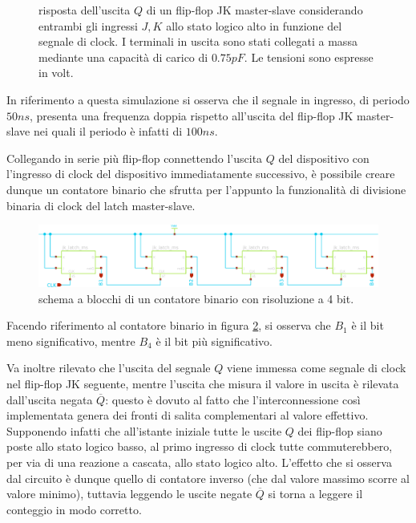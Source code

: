 	\begin{figure}[bht]
		\centering
		
		\vspace{3mm}
		\caption{risposta dell'uscita $Q$ di un flip-flop JK master-slave considerando entrambi gli ingressi $J,K$ allo stato logico alto in funzione del segnale di clock. I terminali in uscita sono stati collegati a massa mediante una capacità di carico di $0.75pF$. Le tensioni sono espresse in volt.}
		\label{fig:count:single}
	\end{figure}
	
	In riferimento a questa simulazione si osserva che il segnale in ingresso, di periodo $50ns$, presenta una frequenza doppia rispetto all'uscita del flip-flop JK master-slave nei quali il periodo è infatti di $100ns$.
	
	Collegando in serie più flip-flop connettendo l'uscita $Q$ del dispositivo con l'ingresso di clock del dispositivo immediatamente successivo, è possibile creare dunque un contatore binario che sfrutta per l'appunto la funzionalità di divisione binaria di clock del latch master-slave.
	
	\begin{figure}[bht]
		\centering
		\includegraphics[width=\linewidth]{Immagini/count-sch}
		\caption{schema a blocchi di un contatore binario con risoluzione a 4 bit.}
		\label{fig:count:sch}
	\end{figure}
	
	Facendo riferimento al contatore binario in figura \ref{fig:count:sch}, si osserva che $B_1$ è il bit meno significativo, mentre $B_4$ è il bit più significativo.
	
	Va inoltre rilevato che l'uscita del segnale $Q$ viene immessa come segnale di clock nel flip-flop JK seguente, mentre l'uscita che misura il valore in uscita è rilevata dall'uscita negata $\overline Q$: questo è dovuto al fatto che l'interconnessione così implementata genera dei fronti di salita complementari al valore effettivo. Supponendo infatti che all'istante iniziale tutte le uscite $Q$ dei flip-flop siano poste allo stato logico basso, al primo ingresso di clock tutte commuterebbero, per via di una reazione a cascata, allo stato logico alto. L'effetto che si osserva dal circuito è dunque quello di contatore inverso (che dal valore massimo scorre al valore minimo), tuttavia leggendo le uscite negate $\overline Q$ si torna a leggere il conteggio in modo corretto.
	
